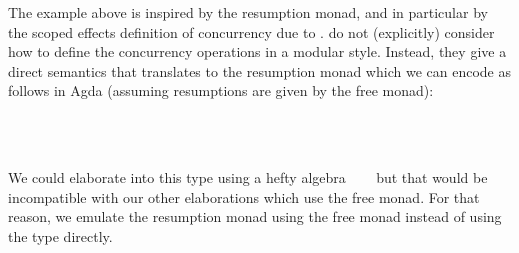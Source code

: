 The example above is inspired by the resumption monad, and in particular by the scoped effects definition of concurrency due to \citet{YangPWBS22}.
\citeauthor{YangPWBS22} do not (explicitly) consider how to define the concurrency operations in a modular style.
Instead, they give a direct semantics that translates to the resumption monad which we can encode as follows in Agda (assuming resumptions are given by the free monad):
%
\begin{code}%
\>[0][@{}l@{\AgdaIndent{1}}]%
\>[2]\AgdaSpace{}%
\AgdaSpace{}%
\AgdaSpace{}%
\AgdaSpace{}%
\AgdaSymbol{:}\AgdaSpace{}%
\AgdaSpace{}%
\<%
\\
\>[2][@{}l@{\AgdaIndent{0}}]%
\>[4]%
\>[10]\AgdaSymbol{:}\AgdaSpace{}%
%
\>[37]\AgdaSpace{}%
\AgdaSpace{}%
\AgdaSpace{}%
\<%
\\
%
\>[4]%
\>[10]\AgdaSymbol{:}\AgdaSpace{}%
\AgdaSpace{}%
\AgdaSpace{}%
\AgdaSymbol{(}\AgdaSpace{}%
\AgdaSpace{}%
\AgdaSymbol{)}%
\>[37]\AgdaSpace{}%
\AgdaSpace{}%
\AgdaSpace{}%
\<%
\end{code}
%
We could elaborate into this type using a hefty algebra ~~\as{(}~\as{)} but that would be incompatible with our other elaborations which use the free monad.
For that reason, we emulate the resumption monad using the free monad instead of using the  type directly.



